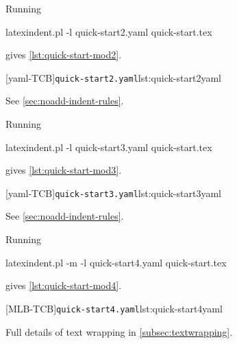  \begin{example}
 Running

 \begin{commandshell}
latexindent.pl -l quick-start2.yaml quick-start.tex
\end{commandshell}

 gives \cref{lst:quick-start-mod2}.

 \begin{cmhtcbraster}
  [yaml-TCB]{\texttt{quick-start2.yaml}}{lst:quick-start2yaml}
 \end{cmhtcbraster}
 See \cref{sec:noadd-indent-rules}.
 \end{example}

 \begin{example}
 Running

 \begin{commandshell}
latexindent.pl -l quick-start3.yaml quick-start.tex
\end{commandshell}

 gives \cref{lst:quick-start-mod3}.

 \begin{cmhtcbraster}
  [yaml-TCB]{\texttt{quick-start3.yaml}}{lst:quick-start3yaml}
 \end{cmhtcbraster}
 See \cref{sec:noadd-indent-rules}.
 \end{example}

 \begin{example}
 Running

 \begin{commandshell}
latexindent.pl -m -l quick-start4.yaml quick-start.tex
\end{commandshell}

 gives \cref{lst:quick-start-mod4}.

 \begin{cmhtcbraster}
  [MLB-TCB]{\texttt{quick-start4.yaml}}{lst:quick-start4yaml}
 \end{cmhtcbraster}
 Full details of text wrapping in \cref{subsec:textwrapping}.
 \end{example}

